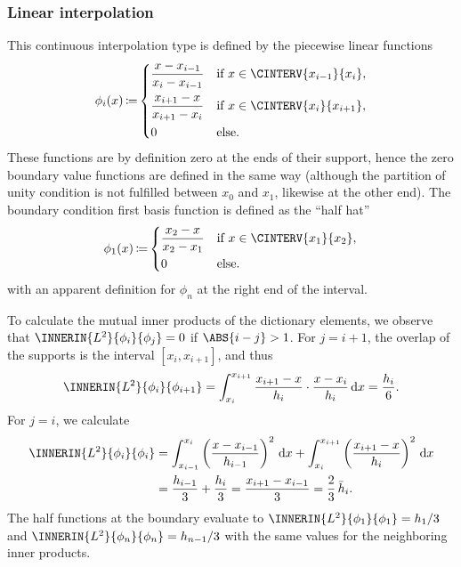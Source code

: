\documentclass[a4paper]{paper}
\DeclareMathOperator{\DEFEQ}{{\coloneqq}}
\newcommand*{\D}{{\ensuremath{\mathrm{d}}}}
\begin{document}
\subsubsection{Linear interpolation}
\label{subsubsec:specif:interp:linear}

This continuous interpolation type is defined by the piecewise linear functions 
%
\begin{equation*}
 \phi_i(x) \DEFEQ
 \begin{dcases}
  \frac{x - x_{i-1}}{x_i - x_{i-1}} & \text{if } x \in \CINTERV{x_{i-1}}{x_i}, \\
  \frac{x_{i+1} - x}{x_{i+1} - x_i} & \text{if } x \in \CINTERV{x_i}{x_{i+1}}, \\
  0 & \text{else}.
 \end{dcases}
\end{equation*}
%
These functions are by definition zero at the ends of their support, hence the zero boundary value functions are 
defined in the same way (although the partition of unity condition is not fulfilled between $x_0$ and $x_1$, likewise 
at the other end). The boundary condition first basis function is defined as the ``half hat''
%
\begin{equation*}
 \phi_1(x) \DEFEQ
 \begin{dcases}
  \frac{x_2 - x}{x_2 - x_1} & \text{if } x \in \CINTERV{x_1}{x_2}, \\
  0 & \text{else}.
 \end{dcases}
\end{equation*}
%
with an apparent definition for $\phi_n$ at the right end of the interval.

To calculate the mutual inner products of the dictionary elements, we observe that 
$\INNERIN{L^2}{\phi_i}{\phi_j} = 0$ if $\ABS{i-j} > 1$. For $j=i+1$, the overlap of the supports is the 
interval ${[x_i, x_{i+1}]}$, and thus
%
\begin{equation*}
 \INNERIN{L^2}{\phi_i}{\phi_{i+1}}
 = \int_{x_i}^{x_{i+1}} \frac{x_{i+1} - x}{h_i} \cdot \frac{x - x_i}{h_i}\, \D x
 = \frac{h_i}{6}.
\end{equation*}
%
For $j=i$, we calculate
%
\begin{align*}
 \INNERIN{L^2}{\phi_i}{\phi_i}
 &= \int_{x_{i-1}}^{x_i} \left( \frac{x - x_{i-1}}{h_{i-1}} \right)^2\, \D x +
 \int_{x_i}^{x_{i+1}} \left( \frac{x_{i+1} - x}{h_i} \right)^2\, \D x \\
 &= \frac{h_{i-1}}{3} + \frac{h_i}{3} 
 = \frac{x_{i+1} - x_{i-1}}{3}
 = \frac{2}{3}\, \bar h_i.
\end{align*}
%
The half functions at the boundary evaluate to $\INNERIN{L^2}{\phi_1}{\phi_1} = h_1/3$ and
$\INNERIN{L^2}{\phi_n}{\phi_n} = h_{n-1}/3$ with the same values for the neighboring inner products.
\end{document}
